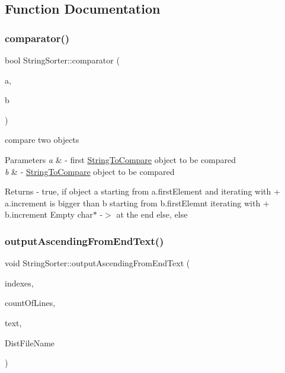 \subsection{Function Documentation}
\mbox{\label{namespaceStringSorter_aaec9bf5e9700c12c60a776b1bfa1482a}} 
\subsubsection{\texorpdfstring{comparator()}{comparator()}}
{\footnotesize\ttfamily bool String\+Sorter\+::comparator (\begin{DoxyParamCaption}\item[{\hyperlink{classStringSorter_1_1StringToCompare}{String\+To\+Compare} \&\&}]{a,  }\item[{\hyperlink{classStringSorter_1_1StringToCompare}{String\+To\+Compare} \&\&}]{b }\end{DoxyParamCaption})}

compare two objects 
\begin{DoxyParams}{Parameters}
{\em a} & -\/ first \hyperlink{classStringSorter_1_1StringToCompare}{String\+To\+Compare} object to be compared \\
\hline
{\em b} & -\/ \hyperlink{classStringSorter_1_1StringToCompare}{String\+To\+Compare} object to be compared \\
\hline
\end{DoxyParams}
\begin{DoxyReturn}{Returns}
-\/ true, if object a starting from a.\+first\+Element and iterating with + a.\+increment is bigger than b starting from b.\+first\+Elemnt iterating with + b.\+increment Empty char$\ast$ -\/$>$ at the end else, else 
\end{DoxyReturn}
\mbox{\label{namespaceStringSorter_aef5de617e1c1d77d92224c3f98924dc3}} 
\subsubsection{\texorpdfstring{output\+Ascending\+From\+End\+Text()}{outputAscendingFromEndText()}}
{\footnotesize\ttfamily void String\+Sorter\+::output\+Ascending\+From\+End\+Text (\begin{DoxyParamCaption}\item[{size\+\_\+t $\ast$}]{indexes,  }\item[{size\+\_\+t}]{count\+Of\+Lines,  }\item[{char $\ast$}]{text,  }\item[{char $\ast$}]{Dist\+File\+Name }\end{DoxyParamCaption})}

